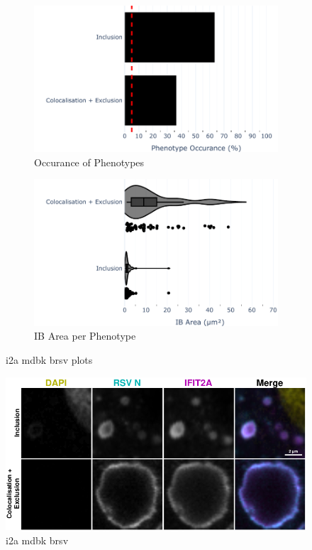 \begin{figure}
    \begin{subfigure}{0.5\textwidth}
    \includegraphics[width=1\linewidth]{10. Chapter 5/Figs/01. Infection/01. IFIT2A/13. bar_i2a_mdbk.pdf} 
    \caption[]{Occurance of Phenotypes}
    \end{subfigure}
    \begin{subfigure}{0.5\textwidth}
    \includegraphics[width=1\linewidth]{10. Chapter 5/Figs/01. Infection/01. IFIT2A/14. violin_i2a_mdbk.pdf}
    \caption[]{IB Area per Phenotype}
    \end{subfigure}
    \caption[i2a mdbk brsv plots]{i2a mdbk brsv plots}
    \label{fig:i2a mdbk brsv plots}
\end{figure}

\begin{figure}
    \centering
    \includegraphics[width=1\linewidth]{10. Chapter 5/Figs/01. Infection/01. IFIT2A/15. i2a mdbk brsv.pdf}
    \caption[i2a mdbk brsv]{i2a mdbk brsv}
    \label{fig:i2a mdbk brsv}
\end{figure}

